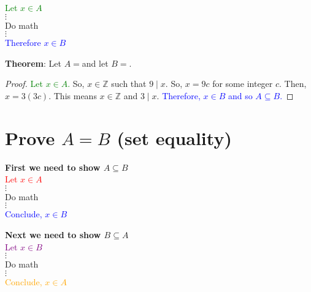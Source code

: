 \documentclass[11pt, oneside]{article}
\begin{document}
		\begin{center}
		\textcolor{green}{Let $x \in A$} \\
		   $\vdots$ \\ Do math   \\ $\vdots$ \\  
		\textcolor{blue}{Therefore  $x \in B$}\\[0.2in]
		\end{center}
		
 \noindent \textbf{Theorem}: Let $A=$\textbraceright and let $B=$\textbraceright.
 
 \begin{proof}
 \textcolor{green}{Let $x\in A$.}
 So, $x\in \mathbb{Z}$ such that $9\mid x$. So, $x=9c$ for some integer $c$. Then, $x=3(3c)$. This means $x\in \mathbb{Z}$ and $3\mid x$. \textcolor{blue}{Therefore, $x\in B$ and so $A\subseteq B$.}
 \end{proof}
 

	
 		\newpage
 
 \section{Prove  $A=B$ (set equality)}
 
		 \begin{multicols}{2}
		 \begin{minipage}{3in}
		 \begin{center}
		\textbf{First we need to show $A \subseteq B$}\\
		 \textcolor{red}{Let $x \in A$}\\ 
         	   $\vdots$ \\ Do math   \\ $\vdots$ \\  
        	 	   \textcolor{blue}{Conclude, $x \in B$}\\[0.2in] 
          	  \end{center} \end{minipage} 
         	   \begin{minipage}{3in} \begin{center} 
          		\textbf{Next we need to show $B \subseteq A$}\\
          		  \textcolor{purple}{Let $x \in B$} \\
                      $\vdots$ \\ Do math   \\ $\vdots$ \\  
                      \textcolor{orange}{Conclude, $x \in A$}\\[0.2in]
                      \end{center}  \end{minipage} \end{multicols} 
                      
\end{document}
